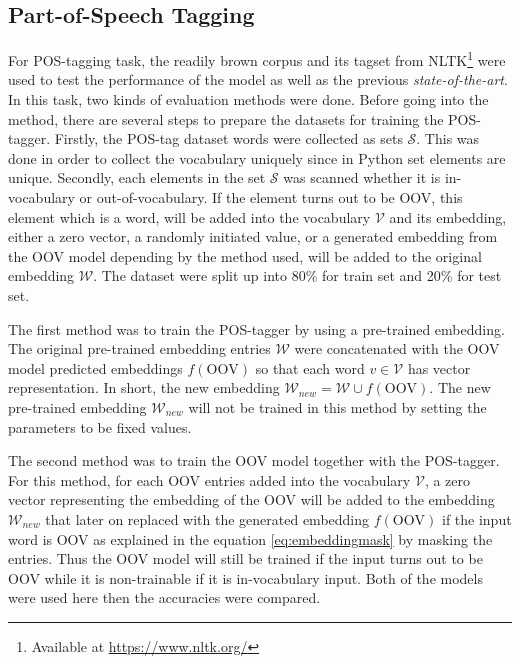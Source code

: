     \subsection{Part-of-Speech Tagging}
        For POS-tagging task, the readily brown corpus and its tagset
        from NLTK\footnote{Available at \url{https://www.nltk.org/}}
        were used to test the performance of the model as well as the
        previous \textit{state-of-the-art}. In this task, two kinds
        of evaluation methods were done. Before going into the method,
        there are several steps to prepare the datasets for training
        the POS-tagger. Firstly, the POS-tag dataset words were
        collected as sets $\mathcal{S}$. This was done in order to
        collect the vocabulary uniquely since in Python set elements
        are unique. Secondly, each elements in the set $\mathcal{S}$
        was scanned whether it is in-vocabulary or out-of-vocabulary.
        If the element turns out to be OOV, this element which is a
        word, will be added into the vocabulary $\mathcal{V}$ and its
        embedding, either a zero vector, a randomly initiated value,
        or a generated embedding from the OOV model depending by the
        method used, will be added to the original embedding
        $\mathcal{W}$. The dataset were split up into 80\% for train
        set and 20\%  for test set.
        
        The first method was to train the POS-tagger by using a
        pre-trained embedding. The original pre-trained embedding entries
        $\mathcal{W}$ were concatenated with the OOV model predicted
        embeddings $f(\text{OOV})$ so that each word $v \in
        \mathcal{V}$ has vector representation. In short, the new
        embedding $\mathcal{W}_{new} = \mathcal{W} \cup
        f(\text{OOV})$. The new pre-trained embedding
        $\mathcal{W}_{new}$ will not be trained in this method by
        setting the parameters to be fixed values.
        
        The second method was to train the OOV model together with the
        POS-tagger. For this method, for each OOV entries added into
        the vocabulary $\mathcal{V}$, a zero vector representing the
        embedding of the OOV will be added to the embedding
        $\mathcal{W}_{new}$ that later on replaced with the
        generated embedding $f(\text{OOV})$ if the input word is OOV
        as explained in the equation \ref{eq:embeddingmask} by masking
        the entries. Thus the OOV model will still be trained if the
        input turns out to be OOV while it is non-trainable if it is
        in-vocabulary input. Both of the models were used here then
        the accuracies were compared.

